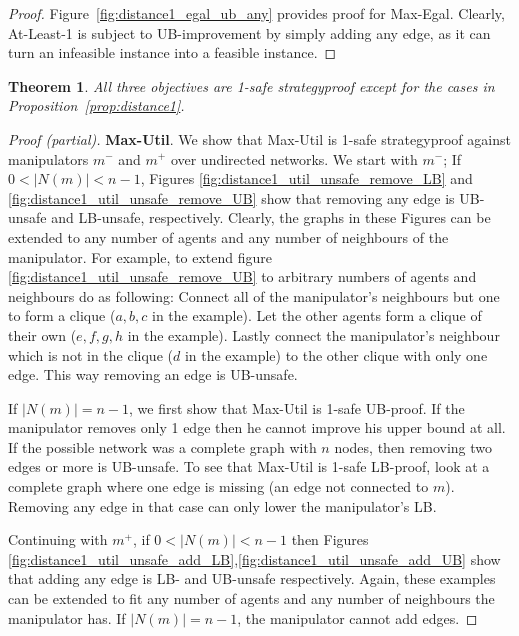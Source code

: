 \documentclass{article}
\newtheorem{theorem}{Theorem}
\begin{document}
\begin{proof}
Figure~\ref{fig:distance1_egal_ub_any} provides proof for Max-Egal.
Clearly, At-Least-1 is subject to UB-improvement by simply adding any edge, as it can turn an infeasible instance into a feasible instance.
\end{proof}

\begin{theorem}
\label{thm:all_distance1}
All three objectives are 1-safe strategyproof except for the cases in Proposition~\ref{prop:distance1}.

\end{theorem}

\begin{proof}[Proof (partial)]
\textbf{Max-Util}. 
We show that Max-Util is 1-safe strategyproof against manipulators $m^-$ and $m^+$ over undirected networks. We start with $m^-$;
If $0<|N(m)|<n-1$, Figures \ref{fig:distance1_util_unsafe_remove_LB} and \ref{fig:distance1_util_unsafe_remove_UB} show that removing any edge is UB-unsafe and LB-unsafe, respectively.
Clearly, the graphs in these Figures can be extended to any number of agents and any number of neighbours of the manipulator. For example, to extend figure \ref{fig:distance1_util_unsafe_remove_UB} to arbitrary numbers of agents and neighbours do as following: Connect all of the manipulator's neighbours but one to form a clique ($a,b,c$ in the example). Let the other agents form a clique of their own ($e,f,g,h$ in the example). Lastly connect the manipulator's neighbour which is not in the clique ($d$ in the example) to the other clique with only one edge. This way removing an edge is UB-unsafe.

If $|N(m)|=n-1$,
%
we first show that Max-Util is 1-safe UB-proof.
If the manipulator removes only 1 edge then he cannot improve his upper bound at all.
If the possible network was a complete graph with $n$ nodes, then removing two edges or more is UB-unsafe.
To see that Max-Util is 1-safe LB-proof, look at a complete graph where one edge is missing (an edge not connected to $m$). Removing any edge in that case can only lower the manipulator's LB.
%

Continuing with $m^+$, if $0<|N(m)|<n-1$ then Figures \ref{fig:distance1_util_unsafe_add_LB},\ref{fig:distance1_util_unsafe_add_UB} show that adding any edge is LB- and UB-unsafe respectively.
Again, these examples can be extended to fit any number of agents and any number of neighbours the manipulator has.
If $|N(m)|=n-1$, the manipulator cannot add edges.


\end{proof}
\end{document}
